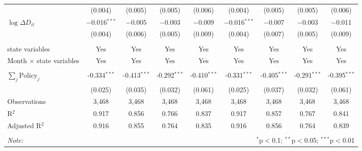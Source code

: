 \begin{tabular}{@{\extracolsep{1pt}}lcccccccc}
  & (0.004) & (0.005) & (0.005) & (0.006) & (0.004) & (0.005) & (0.005) & (0.006) \\ 
  $\log \Delta D_{it}$ & $-$0.016$^{***}$ & $-$0.005 & $-$0.003 & $-$0.009 & $-$0.016$^{***}$ & $-$0.007 & $-$0.003 & $-$0.011 \\ 
  & (0.004) & (0.006) & (0.005) & (0.009) & (0.004) & (0.007) & (0.005) & (0.009) \\ 
 \hline \\[-1.8ex] 
state variables & Yes & Yes & Yes & Yes & Yes & Yes & Yes & Yes \\ 
Month $\times$ state variables & Yes & Yes & Yes & Yes & Yes & Yes & Yes & Yes \\ 
\hline \\[-1.8ex] 
$\sum_j \mathrm{Policy}_j$ & -0.334$^{***}$ & -0.413$^{***}$ & -0.292$^{***}$ & -0.410$^{***}$ & -0.331$^{***}$ & -0.405$^{***}$ & -0.291$^{***}$ & -0.395$^{***}$ \\ 
 & (0.025) & (0.035) & (0.032) & (0.061) & (0.025) & (0.037) & (0.032) & (0.061) \\ 
Observations & 3,468 & 3,468 & 3,468 & 3,468 & 3,468 & 3,468 & 3,468 & 3,468 \\ 
R$^{2}$ & 0.917 & 0.856 & 0.766 & 0.837 & 0.917 & 0.857 & 0.767 & 0.841 \\ 
Adjusted R$^{2}$ & 0.916 & 0.855 & 0.764 & 0.835 & 0.916 & 0.856 & 0.764 & 0.839 \\ 
\hline 
\hline \\[-1.8ex] 
\textit{Note:}  & \multicolumn{8}{r}{$^{*}$p$<$0.1; $^{**}$p$<$0.05; $^{***}$p$<$0.01} \\ 
\end{tabular} 
